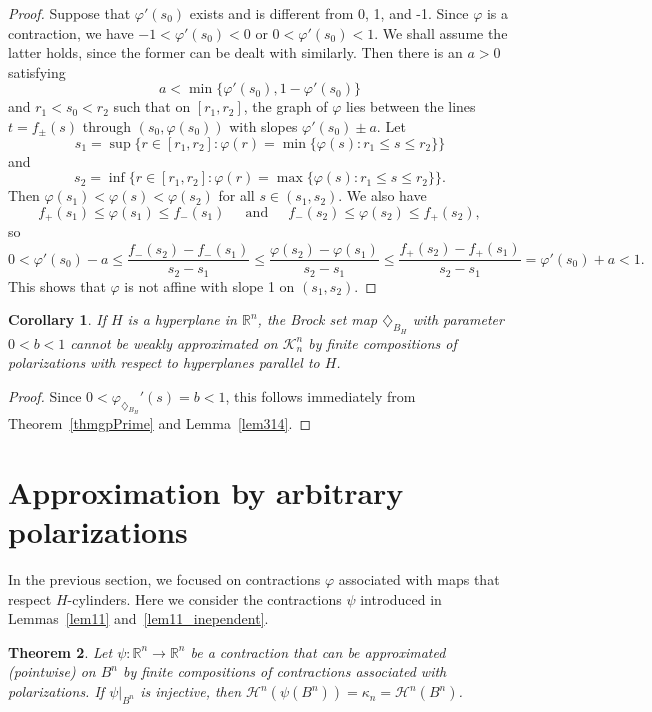 \documentclass[12pt,reqno]{amsart}
\newcommand{\R}{{\mathbb R}}
\newcommand{\cH}{{\mathcal H}}
\newcommand{\cK}{\mathcal K}
\newtheorem{thm}{Theorem}[section]
\newtheorem{cor}[thm]{Corollary}
\newcommand{\di}{\diamondsuit}
\numberwithin{equation}{section}
\begin{document}
\begin{proof}
Suppose that $\varphi'(s_0)$ exists and is different from 0, 1, and -1.
Since $\varphi$ is a contraction, we have $-1<\varphi'(s_0)<0$ or $0<\varphi'(s_0)<1$.  We shall assume the latter holds, since the former can be dealt with similarly. Then there is an $a>0$ satisfying
$$a<\min\{\varphi'(s_0), 1-\varphi'(s_0)\}$$
and $r_1<s_0<r_2$ such that on $[r_1,r_2]$, the graph of $\varphi$ lies between the lines $t=f_{\pm}(s)$ through $(s_0, \varphi(s_0))$ with slopes $\varphi'(s_0)\pm a$.  Let
$$
s_1=\sup\{r\in[r_1,r_2] : \varphi(r)=\min\{\varphi(s): r_1\leq s \leq r_2\}\}
$$
and
$$
s_2=\inf\{r\in[r_1,r_2] : \varphi(r)=\max\{\varphi(s): r_1\leq s \leq r_2\}\}.
$$
Then  $\varphi(s_1)<\varphi(s)<\varphi(s_2)$ for all $s\in (s_1,s_2)$. We also have
$$f_{+}(s_1)\le \varphi(s_1)\le f_-(s_1)~~\quad{\text{and}}~~\quad f_{-}(s_2)\le \varphi(s_2)\le f_+(s_2),$$
so
$$0<\varphi'(s_0)-a\le \frac{f_-(s_2)-f_-(s_1)}{s_2-s_1}\le
\frac{\varphi(s_2)-\varphi(s_1)}{s_2-s_1}\le
\frac{f_+(s_2)-f_+(s_1)}{s_2-s_1}=\varphi'(s_0)+a<1.$$
This shows that $\varphi$ is not affine with slope 1 on $(s_1,s_2)$.
\end{proof}

\begin{cor}\label{cor314}
If $H$ is a hyperplane in $\R^n$, the Brock set map $\di_{B_H}$ with parameter $0<b<1$ cannot be weakly approximated on ${\cK}^n_n$ by finite compositions of polarizations with respect to hyperplanes parallel to $H$.
\end{cor}

\begin{proof}
Since $0<\varphi_{\di_{B_H}}'(s)=b<1$, this follows immediately from Theorem~\ref{thmgpPrime} and Lemma~\ref{lem314}.
\end{proof}

\section{Approximation by arbitrary polarizations}\label{arb}

In the previous section, we focused on contractions $\varphi$ associated with maps that respect $H$-cylinders.  Here we consider the contractions $\psi$ introduced in Lemmas~\ref{lem11} and~\ref{lem11_inependent}.

\begin{thm}\label{lem5}
Let $\psi:\R^n\to\R^n$ be a contraction that can be approximated (pointwise) on $B^n$ by finite compositions of contractions associated with polarizations. If $\psi|_{B^n}$ is injective, then ${\cH}^n(\psi(B^n))=\kappa_n={\cH}^n(B^n)$.
\end{thm}
\end{document}
